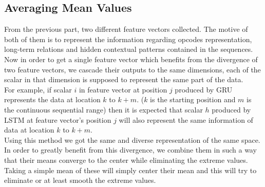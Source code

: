 \documentclass[conference]{IEEEtran}
\begin{document}
\subsection{Averaging Mean Values}
From the previous part, two different feature vectors collected. The motive of both of them is to represent the information regarding opcodes representation, long-term relations and hidden contextual patterns contained in the sequences.\\
Now in order to get a single feature vector which benefits from the divergence of two feature vectors, we cascade their outputs to the same dimensions, each of the scalar in that dimension is
supposed to represent the same part of the data.\\
For example, if scalar \(i\) in feature vector at position \(j\) produced by GRU represents the data at location \(k\) to \(k+m\). (\(k\) is the starting position and \(m\) is the continuous sequential range) then it is expected that scalar \(h\) produced by LSTM at feature vector’s position \(j\) will also represent the
same information of data at location \(k\) to \(k+m\). \\
Using this method we got the same and diverse representation of the same space. In order to greatly benefit from this divergence, we combine them in such a way that their means converge to the center while eliminating the extreme values. Taking a simple
mean of these will simply center their mean and this will try to eliminate or at least smooth the extreme values.
\end{document}
